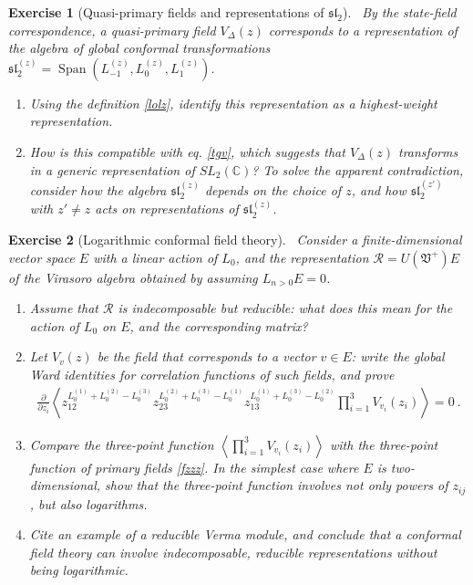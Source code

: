 \documentclass[12pt, a4paper, notitlepage, twoside]{report}
\numberwithin{equation}{section}
\theoremstyle{break}
\newtheorem{exo}{Exercise}[chapter]
\begin{document}
\begin{exo}[Quasi-primary fields and representations of $\mathfrak{sl}_2$]
 ~\label{exoqp}
By the state-field correspondence, a quasi-primary field $V_\Delta(z)$ corresponds to a representation of the algebra of global conformal transformations $\mathfrak{sl}_2^{(z)} = \operatorname{Span}(L_{-1}^{(z)},L_0^{(z)},L_1^{(z)})$.
\begin{enumerate}
 \item 
Using the definition \eqref{lolz}, identify this representation as a highest-weight representation.
\item
How is this compatible with eq. \eqref{tgv}, which suggests that $V_\Delta(z)$ transforms in a generic representation of $SL_2({\mathbb{C}})$? To solve the apparent contradiction, consider how the algebra $\mathfrak{sl}_2^{(z)}$ depends on the choice of $z$, and how $\mathfrak{sl}_2^{(z')}$ with $z'\neq z$ acts on representations of $\mathfrak{sl}_2^{(z)}$.
\end{enumerate}
\end{exo}

\begin{exo}[Logarithmic conformal field theory]
 ~\label{exolog}
Consider a finite-dimensional vector space $E$ with a linear action of $L_0$, and the representation $\mathcal{R}=U(\mathfrak{V}^+)E$ of the Virasoro algebra obtained by assuming $L_{n>0}E=0$.
\begin{enumerate}
 \item 
Assume that $\mathcal{R}$ is indecomposable but reducible: what does this mean for the action of $L_0$ on $E$, and the corresponding matrix? 
\item
Let $V_v(z)$ be the field that corresponds to a vector $v\in E$: write the global Ward identities for correlation functions of such fields, and prove 
\begin{align}
 {\frac{\partial}{\partial z_i}} \left\langle z_{12}^{L_0^{(1)}+L_0^{(2)}-L_0^{(3)}} z_{23}^{L_0^{(2)}+L_0^{(3)}-L_0^{(1)}} z_{13}^{L_0^{(1)}+L_0^{(3)}-L_0^{(2)}} \prod_{i=1}^3 V_{v_i}(z_i)\right\rangle = 0\ .
\end{align}
\item
Compare the three-point function $\left\langle  \prod_{i=1}^3 V_{v_i}(z_i)\right\rangle$ with the three-point function  of primary fields \eqref{fzzz}.
In the simplest case where $E$ is two-dimensional, show that the three-point function involves not only powers of $z_{ij}$, but also logarithms.
\item
Cite an example of a reducible Verma module, and conclude that 
a conformal field theory can involve indecomposable, reducible representations without being logarithmic. 
\end{enumerate}
\end{exo}
\end{document}
